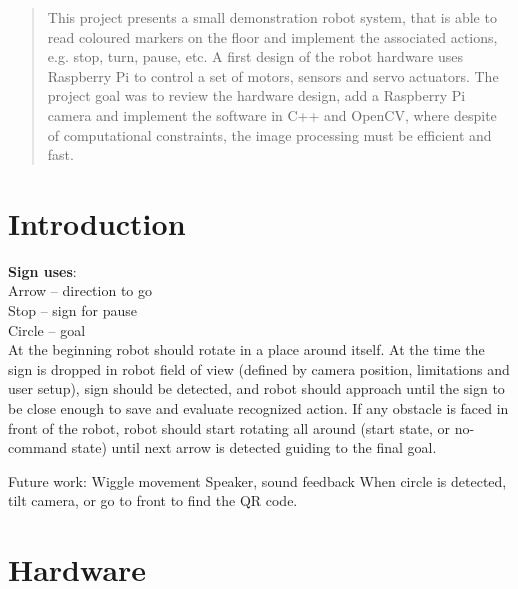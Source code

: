 \documentclass[10pt,twocolumn]{article}
\begin{document}
\begin{abstract}
This project presents a small demonstration robot system, that is able to read coloured markers on the floor and implement the associated actions, e.g. stop, turn, pause, etc.
A first design of the robot hardware uses Raspberry Pi to control a set of
motors, sensors and servo actuators. The project goal was to review the hardware design,
add a Raspberry Pi camera and implement the software in C++ and OpenCV, where despite of computational constraints, the image processing must be efficient and fast.
\end{abstract}

\section{Introduction}

\textbf{Sign uses}:\\
Arrow – direction to go\\
Stop – sign for pause\\
Circle – goal \\

At the beginning robot should rotate in a place around itself.
At the time the sign is dropped in robot field of view (defined by camera position, limitations and user setup), sign should be detected, and robot should approach until the sign to be close enough to save and evaluate recognized action.
If any obstacle is faced in front of the robot, robot should start rotating all around (start state, or no-command state) until next arrow is detected guiding to the final goal.

Future work:
Wiggle movement
Speaker, sound feedback
When circle is detected, tilt camera, or go to front to find the QR code.

\section{Hardware}
\end{document}
